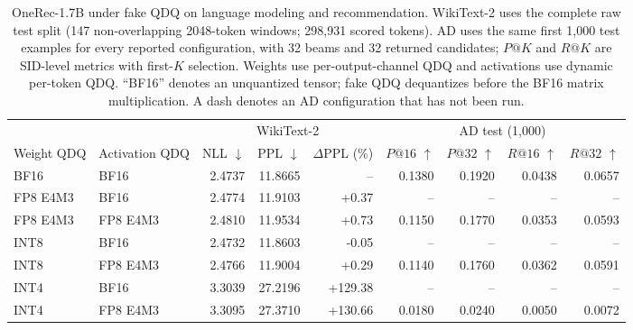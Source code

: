 % 
\begin{table}[!t]
  \centering
  \caption{OneRec-1.7B under fake QDQ on language modeling and recommendation.
  WikiText-2 uses the complete raw test split (147 non-overlapping 2048-token
  windows; 298,931 scored tokens). AD uses the same first 1,000 test examples
  for every reported configuration, with 32 beams and 32 returned candidates;
  $P@K$ and $R@K$ are SID-level metrics with first-$K$ selection. Weights use
  per-output-channel QDQ and activations use dynamic per-token QDQ. ``BF16''
  denotes an unquantized tensor; fake QDQ dequantizes before the BF16 matrix
  multiplication. A dash denotes an AD configuration that has not been run.}
  \label{tab:onerec-fake-qdq-precision-sweep}
  \label{tab:onerec-fake-qdq-wikitext2}
  \scriptsize
  \setlength{\tabcolsep}{3.5pt}
  \begin{tabular}{llrrr|rrrr}
    \hline
    & & \multicolumn{3}{c|}{WikiText-2} & \multicolumn{4}{c}{AD test (1,000)} \\
    \cline{3-9}
    Weight QDQ & Activation QDQ & NLL $\downarrow$ & PPL $\downarrow$ & $\Delta$PPL (\%) & $P@16$ $\uparrow$ & $P@32$ $\uparrow$ & $R@16$ $\uparrow$ & $R@32$ $\uparrow$ \\
    \hline
    BF16     & BF16     & 2.4737 & 11.8665 & --      & 0.1380 & 0.1920 & 0.0438 & 0.0657 \\
    FP8 E4M3 & BF16     & 2.4774 & 11.9103 & +0.37   & --     & --     & --     & --     \\
    FP8 E4M3 & FP8 E4M3 & 2.4810 & 11.9534 & +0.73   & 0.1150 & 0.1770 & 0.0353 & 0.0593 \\
    INT8     & BF16     & 2.4732 & 11.8603 & -0.05   & --     & --     & --     & --     \\
    INT8     & FP8 E4M3 & 2.4766 & 11.9004 & +0.29   & 0.1140 & 0.1760 & 0.0362 & 0.0591 \\
    INT4     & BF16     & 3.3039 & 27.2196 & +129.38 & --     & --     & --     & --     \\
    INT4     & FP8 E4M3 & 3.3095 & 27.3710 & +130.66 & 0.0180 & 0.0240 & 0.0050 & 0.0072 \\
    \hline
  \end{tabular}
\end{table}
